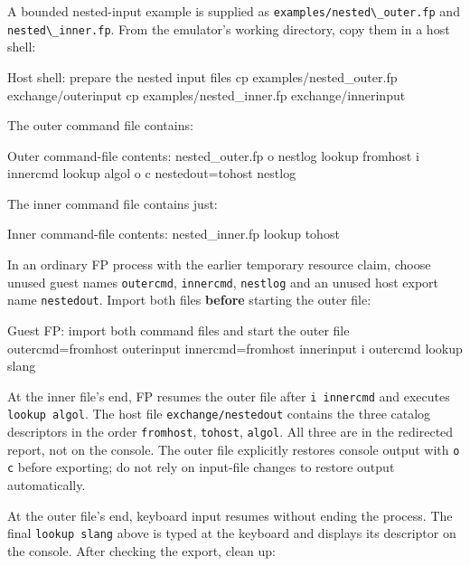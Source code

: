A bounded nested-input example is supplied as \passthrough{\lstinline!examples/nested\_outer.fp!} and \passthrough{\lstinline!nested\_inner.fp!}. From the emulator's working directory, copy them in a host shell:

\begin{commandexample}[language=sh]{Host shell: prepare the nested input files}
cp examples/nested_outer.fp exchange/outerinput
cp examples/nested_inner.fp exchange/innerinput
\end{commandexample}

The outer command file contains:

\begin{commandexample}{Outer command-file contents: nested\_outer.fp}
o nestlog
lookup fromhost
i innercmd
lookup algol
o c
nestedout=tohost nestlog
\end{commandexample}

The inner command file contains just:

\begin{commandexample}{Inner command-file contents: nested\_inner.fp}
lookup tohost
\end{commandexample}

In an ordinary FP process with the earlier temporary resource claim, choose unused guest names \passthrough{\lstinline!outercmd!}, \passthrough{\lstinline!innercmd!}, \passthrough{\lstinline!nestlog!} and an unused host export name \passthrough{\lstinline!nestedout!}. Import both files \textbf{before} starting the outer file:

\begin{commandexample}{Guest FP: import both command files and start the outer file}
outercmd=fromhost outerinput
innercmd=fromhost innerinput
i outercmd
lookup slang
\end{commandexample}

At the inner file's end, FP resumes the outer file after \passthrough{\lstinline!i innercmd!} and executes \passthrough{\lstinline!lookup algol!}. The host file \passthrough{\lstinline!exchange/nestedout!} contains the three catalog descriptors in the order \passthrough{\lstinline!fromhost!}, \passthrough{\lstinline!tohost!}, \passthrough{\lstinline!algol!}. All three are in the redirected report, not on the console. The outer file explicitly restores console output with \passthrough{\lstinline!o c!} before exporting; do not rely on input-file changes to restore output automatically.

At the outer file's end, keyboard input resumes without ending the process. The final \passthrough{\lstinline!lookup slang!} above is typed at the keyboard and displays its descriptor on the console. After checking the export, clean up:

